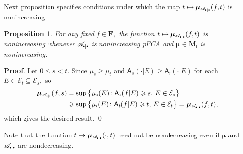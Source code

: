 \documentclass[preprint,11pt]{elsarticle}
\newtheorem{proposition}[tw]{Proposition}
\theoremstyle{definition}
\newtheorem{example}[tw]{Example}
\renewenvironment{proof}[1][\textbf{Proof}]{\noindent\textbf{#1.} }{\hfill\qed\vspace{2.5ex}}
\newcommand\bF{\mathbf{F}} %
\newcommand\bMf{\mathbf{M}_{\mathrm{f}}}%
\newcommand\cE{{\mathcal E}}
\newcommand\sA{\mathsf{A}}
\newcommand\sbullet[1][.5]{\mathbin{\vcenter{\hbox{\scalebox{#1}{$\bullet$}}}}}
\newcommand\bA{\mathscr{A}}%
\newcommand\bpeA{\mathscr {A}_{\sbullet|\sbullet}}%
\newcommand\bE{{\mathscr {E}}}
\newcommand\mub[1][\bA]{\mu_{#1}}
\newcommand{\bmu}{\boldsymbol{\mu}}
\newcommand\bmub[1][\bpeA]{\bmu_{#1}}
\renewcommand\ge{\geqslant}
\renewcommand\le{\leqslant}
\newcommand{\mI}[1]{\mathbbm{1}_{#1}}%
\newcommand{\mb}{\color{blue}{}}
\newcommand{\mk}{\color{red}{}}
\newcommand{\mi}{\color{darkgreen}{}}
\begin{document}
Next proposition specifies conditions under which the map $t\mapsto \bmub(f,t)$ is nonincreasing.

\begin{proposition}
For any fixed $f\in \bF,$ the function $t\mapsto \bmub(f,t)$  is nonincreasing whenever $\bpeA$ is nonincreasing pFCA and $\bmu\in\bMf$ is nonincreasing.
\end{proposition}
\begin{proof}
 Let $0\le s<t.$ Since $\mu_s\ge \mu_t$ and $\sA_s(\cdot|E)\ge \sA_t(\cdot|E)$ for each $E\in \cE_t\subseteq \cE_s,$ so
\begin{align*}
    \bmub(f,s)&=\sup\big\{\mu_s(E)\colon \sA_s(f|E)\ge s,\,E\in \cE_s\big\}\\&\ge\sup\big\{\mu_t(E)\colon \sA_t(f|E)\ge t,\,E\in \cE_t\big\}= \bmub(f,t),
\end{align*}
which gives the desired result.
\end{proof}

Note that the function $t\mapsto \bmub(\cdot,t)$ need not be nondecreasing even if $\bmu$ and $\bpeA$ are nondecreasing.

\end{document}
